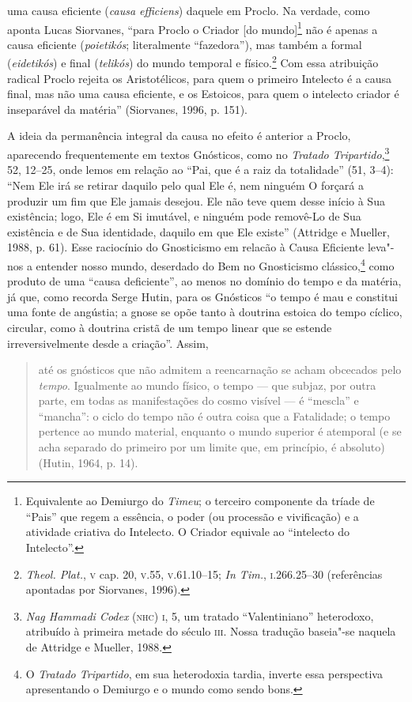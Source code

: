 uma causa eficiente (\emph{causa efficiens}) daquele em
Proclo. Na verdade, como aponta Lucas Siorvanes, “para Proclo o
Criador [do mundo]\footnote{ Equivalente ao Demiurgo do
\emph{Timeu}; o terceiro componente da tríade de “Pais” que
regem a essência, o poder (ou processão e vivificação) e a
atividade criativa do Intelecto. O Criador equivale ao
“intelecto do Intelecto”.} não é apenas a causa eficiente
(\emph{poietikós}; literalmente ``fazedora''), mas também a
formal (\emph{eidetikós}) e final (\emph{telikós}) do mundo
temporal e físico.\footnote{ \emph{Theol. Plat.}, \textsc{v} cap. 20,
\textsc{v}.55, \textsc{v}.61.10--15; \emph{In Tim.}, \textsc{i}.266.25--30 (referências
apontadas por Siorvanes, 1996).} Com essa atribuição radical
Proclo rejeita os Aristotélicos, para quem o primeiro Intelecto
é a causa final, mas não uma causa eficiente, e os Estoicos,
para quem o intelecto criador é inseparável da matéria”
(Siorvanes, 1996, p. 151).

A ideia da permanência integral da causa no efeito é anterior a
Proclo, aparecendo frequentemente em textos Gnósticos, como no
\emph{Tratado Tripartido},\footnote{ \emph{Nag Hammadi Codex}
(\textsc{nhc}) \textsc{i}, 5, um tratado “Valentiniano” heterodoxo, atribuído à
primeira metade do século \textsc{iii}. Nossa tradução baseia"-se naquela
de Attridge e Mueller, 1988.} 52, 12--25, onde lemos em relação
ao “Pai, que é a raiz da totalidade” (51, 3--4): “Nem Ele irá se
retirar daquilo pelo qual Ele é, nem ninguém O forçará a
produzir um fim que Ele jamais desejou. Ele não teve quem desse
início à Sua existência; logo, Ele é em Si imutável, e ninguém
pode removê-Lo de Sua existência e de Sua identidade, daquilo em
que Ele existe” (Attridge e Mueller, 1988, p. 61). Esse
raciocínio do Gnosticismo em relacão à Causa Eficiente leva"-nos
a entender nosso mundo, deserdado do Bem no Gnosticismo
clássico,\footnote{ O \emph{Tratado Tripartido}, em sua
heterodoxia tardia, inverte essa perspectiva apresentando o
Demiurgo e o mundo como sendo bons.} como produto de uma “causa
deficiente”, ao menos no domínio do tempo e da matéria, já que,
como recorda Serge Hutin, para os Gnósticos “o tempo é mau e
constitui uma fonte de angústia; a gnose se opõe tanto à
doutrina estoica do tempo cíclico, circular, como à doutrina
cristã de um tempo linear que se estende irreversivelmente desde
a criação”. Assim, 

\begin{quote}
até os gnósticos que não admitem a reencarnação se acham
obcecados pelo \emph{tempo}. Igualmente ao mundo físico, o
tempo --- que subjaz, por outra parte, em todas as manifestações
do cosmo visível --- é “mescla” e “mancha”: o ciclo do tempo não
é outra coisa que a Fatalidade; o tempo pertence ao mundo
material, enquanto o mundo superior é atemporal (e se acha
separado do primeiro por um limite que, em princípio, é
absoluto) (Hutin, 1964, p. 14).
\end{quote}


